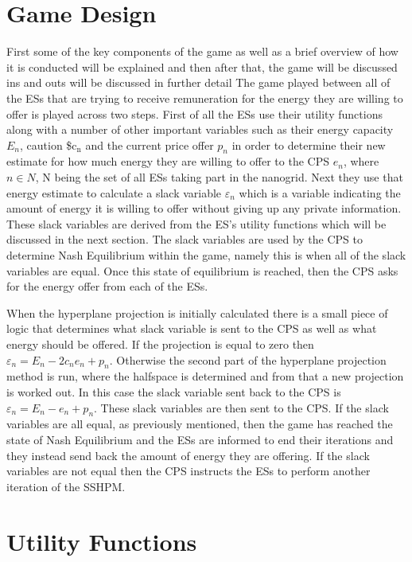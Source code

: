 \documentclass[a4paper, notitlepage]{report}
\begin{document}
\section{Game Design}
\label{sec:org9fa8d89}
First some of the key components of the game as well as a brief overview of how
it  is conducted will be explained and then after that, the game will be
discussed ins and outs will be discussed in further detail The game played
between all of the ESs that are trying to receive remuneration for the energy
they are willing to offer is played across two steps. First of all the ESs use
their utility functions along with a number of other important variables such as
their energy capacity \(E_n\), caution \$c\(_{\text{n}}\) and the current price offer \(p_n\) in
order to determine their new estimate for how much energy they are willing to
offer to the CPS \(e_n\), where \(n \in N\), N being the set of all ESs taking part in
the nanogrid. Next they use that energy estimate to calculate a slack variable
\(\varepsilon_n\) which is a variable indicating the amount of energy it is willing to offer
without giving up any private information. These slack variables are derived
from the ES's utility functions which will be discussed in the next section. The
slack variables are used by the CPS to determine Nash Equilibrium within the
game, namely this is when all of the slack variables are equal. Once this state
of equilibrium is reached, then the CPS asks for the energy offer from each of the
ESs.

When the hyperplane projection is initially calculated there is a small piece of
logic that determines what slack variable is sent to the CPS as well as what
energy should be offered. If the projection is equal to zero then \(\varepsilon_n = E_n -
2c_{n}e_{n} + p_n\). Otherwise the second part of the hyperplane projection method is
run, where the halfspace is determined and from that a new projection is worked
out. In this case the slack variable sent back to the CPS is \(\varepsilon_n = E_n - e_n +
p_n\). These slack variables are then sent to the CPS. If the slack variables are
all equal, as previously mentioned, then the game has reached the state of Nash
Equilibrium and the ESs are informed to end their iterations and they instead
send back the amount of energy they are offering. If the slack variables are not
equal then the CPS instructs the ESs to perform another iteration of the SSHPM.
\section{Utility Functions}
\label{sec:orgfc7a4cd}
\end{document}
